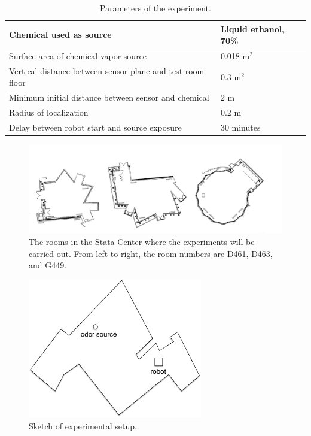 \documentclass[submit]{aiaa-pretty-modified}
\newcommand{\tablewidthtwo}[0]{3in}
\begin{document}
\begin{table}
\caption{Parameters of the experiment.}
\begin{center}
\begin{tabular}{|p{\tablewidthtwo}|p{\tablewidthtwo}|}
\hline
Chemical used as source & Liquid ethanol, 70\% \\ \hline
Surface area of chemical vapor source & 0.018 $\text{m}^2$\\ \hline
Vertical distance between sensor plane and
test room floor & 0.3 $\text{m}^2$ \\ \hline
Minimum initial distance between sensor and chemical & 2 $\text{m}$ \\ \hline
Radius of localization & 0.2 $\text{m}$ \\ \hline
Delay between robot start and source exposure & 30 minutes \\ \hline
\end{tabular}
\end{center}
\label{tab:parameters}
\end{table}

\begin{figure}
\begin{center}
\includegraphics[width=7in]{img/rooms.pdf}
\caption{The rooms in the Stata Center where the experiments will
  be carried out.  From left to right, the room numbers are D461,
  D463, and G449.}
\label{fig:floorplans}
\end{center}
\end{figure}


\begin{figure}
\begin{center}
\includegraphics[width=3in]{img/layout.pdf}
\caption{Sketch of experimental setup.}
\label{fig:layout}
\end{center}
\end{figure}
\end{document}
